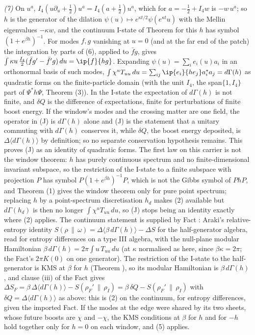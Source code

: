 \emph{(7)} On $u^{a}$, $I_{4}(u\partial_{u} + \tfrac12)u^{a} = I_{4}(a + \tfrac12)u^{a}$, which for $a = -\tfrac12 + I_{4}w$ is $-w\,u^{a}$; so $h$ is the generator of the dilation $\psi(u) \mapsto e^{\kappa t/2}\psi(e^{\kappa t}u)$ with the Mellin eigenvalues $-\kappa w$, and the continuum I-state of Theorem  for this $h$ has symbol $(1 + e^{\beta h})^{-1}$. For modes $f, g$ vanishing at $u = 0$ (and at the far end of the patch) the integration by parts of (6), applied to $\bar f g$, gives $\int\kappa u\,\tfrac{I_{4}}{2}(\bar f g' - \bar f' g)\,du = \ip{f}{hg}$. Expanding $\psi(u) = \sum_{i}e_{i}(u)a_{i}$ in an orthonormal basis of such modes, $\int\chi^{u}T_{uu}\,du = \sum_{ij}\ip{e_{i}}{he_{j}}a_{i}^{*}a_{j} = d\Gamma(h)$ as quadratic forms on the finite-particle domain (with the unit $I_{4}$, the span$\{1, I_{4}\}$ part of $\Psi^{*}h\Psi$, Theorem (3)). In the I-state the expectation of $d\Gamma(h)$ is not finite, and $\delta Q$ is the difference of expectations, finite for perturbations of finite boost energy. If the window's modes and the crossing matter are one field, the operator in (J) is $d\Gamma(h)$ alone and (J) is the statement that a unitary commuting with $d\Gamma(h)$ conserves it, while $\delta Q$, the boost energy deposited, is $\Delta\langle d\Gamma(h)\rangle$ by definition; so no separate conservation hypothesis remains. This proves (J) as an identity of quadratic forms. The first law on this carrier is not the window theorem: $h$ has purely continuous spectrum and no finite-dimensional invariant subspace, so the restriction of the I-state to a finite subspace with projection $P$ has symbol $P(1 + e^{\beta h})^{-1}P$, which is not the Gibbs symbol of $PhP$, and Theorem (1) gives the window theorem only for pure point spectrum; replacing $h$ by a point-spectrum discretisation $h_{d}$ makes (2) available but $d\Gamma(h_{d})$ is then no longer $\int\chi^{u}T_{uu}\,du$, so (J) stops being an identity exactly where (2) applies. The continuum statement is supplied by Fact : Araki's relative-entropy identity $S(\rho\,\|\,\omega) = \Delta\langle\beta\,d\Gamma(h)\rangle - \Delta S$ for the half-generator algebra, read for entropy differences on a type III algebra, with the null-plane modular Hamiltonian $\beta\,d\Gamma(h) = 2\pi\int u\,T_{uu}\,du$ (at $\kappa$ normalised as here, since $\beta\kappa = 2\pi$; the Fact's $2\pi K(0)$ on one generator). The restriction of the I-state to the half-generator is KMS at $\beta$ for $h$ (Theorem ), so its modular Hamiltonian is $\beta\,d\Gamma(h)$, and clause (iii) of the Fact gives $\Delta S_{F} = \beta\,\Delta\langle d\Gamma(h)\rangle - S(\rho_{F}'\,\|\,\rho_{I}) = \beta\,\delta Q - S(\rho_{F}'\,\|\,\rho_{I})$ with $\delta Q = \Delta\langle d\Gamma(h)\rangle$ as above: this is (2) on the continuum, for entropy differences, given the imported Fact. If the modes at the edge were shared by its two sheets, whose future boosts are $\chi$ and $-\chi$, the KMS conditions at $\beta$ for $h$ and for $-h$ hold together only for $h = 0$ on each window, and (5) applies.

